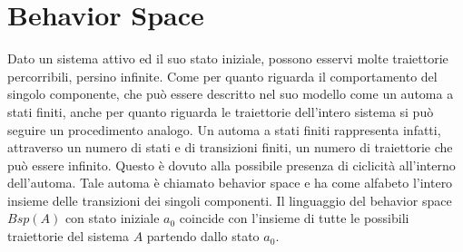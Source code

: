 \section{Behavior Space}
Dato un sistema attivo ed il suo stato iniziale, possono esservi molte traiettorie percorribili, persino infinite. Come per quanto riguarda il comportamento del singolo componente, che può essere descritto nel suo modello come un automa a stati finiti, anche per quanto riguarda le traiettorie dell'intero sistema si può seguire un procedimento analogo. Un automa a stati finiti rappresenta infatti, attraverso un numero di stati e di transizioni finiti, un numero di traiettorie che può essere infinito. Questo è dovuto alla possibile presenza di ciclicità all'interno dell'automa. Tale automa è chiamato behavior space e ha come alfabeto l'intero insieme delle transizioni dei singoli componenti.
Il linguaggio del behavior space $Bsp(A)$ con stato iniziale $a_0$ coincide con l'insieme di tutte le possibili traiettorie del sistema $A$ partendo dallo stato $a_0$. 
